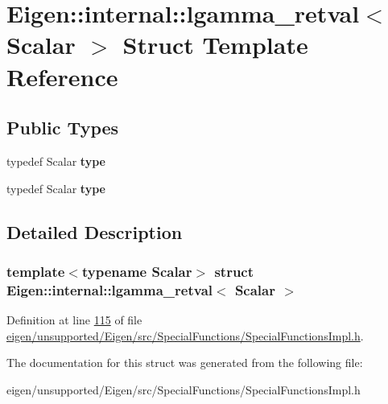 \hypertarget{struct_eigen_1_1internal_1_1lgamma__retval}{}\section{Eigen\+:\+:internal\+:\+:lgamma\+\_\+retval$<$ Scalar $>$ Struct Template Reference}
\label{struct_eigen_1_1internal_1_1lgamma__retval}
\subsection*{Public Types}
\begin{DoxyCompactItemize}
\item 
\mbox{\label{struct_eigen_1_1internal_1_1lgamma__retval_a676b3efd8baa74e9ddcd2d410a393dea}} 
typedef Scalar {\bfseries type}
\item 
\mbox{\label{struct_eigen_1_1internal_1_1lgamma__retval_a676b3efd8baa74e9ddcd2d410a393dea}} 
typedef Scalar {\bfseries type}
\end{DoxyCompactItemize}


\subsection{Detailed Description}
\subsubsection*{template$<$typename Scalar$>$\newline
struct Eigen\+::internal\+::lgamma\+\_\+retval$<$ Scalar $>$}



Definition at line \hyperlink{eigen_2unsupported_2_eigen_2src_2_special_functions_2_special_functions_impl_8h_source_l00115}{115} of file \hyperlink{eigen_2unsupported_2_eigen_2src_2_special_functions_2_special_functions_impl_8h_source}{eigen/unsupported/\+Eigen/src/\+Special\+Functions/\+Special\+Functions\+Impl.\+h}.



The documentation for this struct was generated from the following file\+:\begin{DoxyCompactItemize}
\item 
eigen/unsupported/\+Eigen/src/\+Special\+Functions/\+Special\+Functions\+Impl.\+h\end{DoxyCompactItemize}
